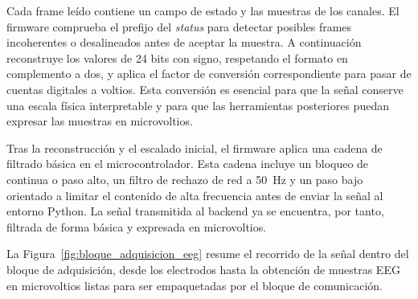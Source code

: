 \documentclass[../main.tex]{subfiles}
\begin{document}
Cada frame leído contiene un campo de estado y las muestras de los canales. El firmware comprueba el prefijo del \textit{status} para detectar posibles frames incoherentes o desalineados antes de aceptar la muestra. A continuación reconstruye los valores de 24 bits con signo, respetando el formato en complemento a dos, y aplica el factor de conversión correspondiente para pasar de cuentas digitales a voltios. Esta conversión es esencial para que la señal conserve una escala física interpretable y para que las herramientas posteriores puedan expresar las muestras en microvoltios.

Tras la reconstrucción y el escalado inicial, el firmware aplica una cadena de filtrado básica en el microcontrolador. Esta cadena incluye un bloqueo de continua o paso alto, un filtro de rechazo de red a \SI{50}{\hertz} y un paso bajo orientado a limitar el contenido de alta frecuencia antes de enviar la señal al entorno Python. La señal transmitida al backend ya se encuentra, por tanto, filtrada de forma básica y expresada en microvoltios.

La Figura~\ref{fig:bloque_adquisicion_eeg} resume el recorrido de la señal dentro del bloque de adquisición, desde los electrodos hasta la obtención de muestras EEG en microvoltios listas para ser empaquetadas por el bloque de comunicación.
\end{document}
